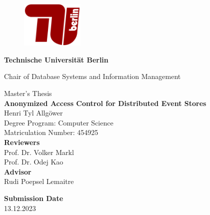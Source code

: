 \thispagestyle{empty}
\begin{center}

\begin{figure}[t]
    \centering
    \includegraphics[width=3cm]{./img/TU-Berlin-Logo.pdf}%
\end{figure}

{\LARGE \textbf{Technische Universit\"at Berlin}}

\vspace{0.5cm}

{\large Chair of Database Systems and Information Management\\[1.6mm]}


\vspace{2.0cm}

{\LARGE Master's Thesis}\\

\vspace{2.45cm}
{\LARGE \textbf{Anonymized Access Control for Distributed Event Stores}}\\
\vspace{1.0cm}
Henri Tyl Allgöwer \\
Degree Program: Computer Science\\
Matriculation Number: 454925\\

\vspace*{2.45cm}
\textbf{Reviewers}\\
Prof. Dr. Volker Markl\\
Prof. Dr. Odej Kao\\
\vspace*{0.5cm}
\textbf{Advisor}\\
Rudi Poepsel Lemaitre\\
\vspace{0.5 cm}

\textbf{Submission Date}\\
13.12.2023\\ %
\end{center}

